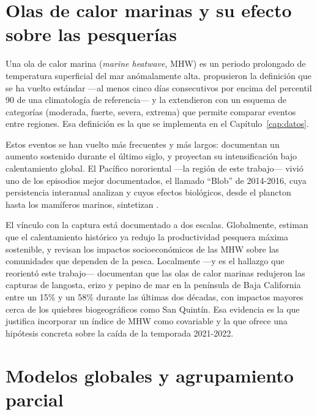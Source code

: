 \section{Olas de calor marinas y su efecto sobre las pesquerías}
\label{sec:revision_mhw}

Una ola de calor marina (\emph{marine heatwave}, MHW) es un periodo prolongado de temperatura
superficial del mar anómalamente alta. \citet{hobday2016} propusieron la definición que se ha
vuelto estándar ---al menos cinco días consecutivos por encima del percentil 90 de una
climatología de referencia--- y \citet{hobday2018} la extendieron con un esquema de categorías
(moderada, fuerte, severa, extrema) que permite comparar eventos entre regiones. Esa definición
es la que se implementa en el Capítulo~\ref{cap:datos}.

Estos eventos se han vuelto más frecuentes y más largos: \citet{oliver2018} documentan un
aumento sostenido durante el último siglo, y \citet{frolicher2018} proyectan su intensificación
bajo calentamiento global. El Pacífico nororiental ---la región de este trabajo--- vivió uno de
los episodios mejor documentados, el llamado ``Blob'' de 2014-2016, cuya persistencia
interanual analizan \citet{dilorenzo2016} y cuyos efectos biológicos, desde el plancton hasta
los mamíferos marinos, sintetizan \citet{cavole2016}.

El vínculo con la captura está documentado a dos escalas. Globalmente, \citet{free2019}
estiman que el calentamiento histórico ya redujo la productividad pesquera máxima sostenible, y
\citet{smith2021} revisan los impactos socioeconómicos de las MHW sobre las comunidades que
dependen de la pesca. Localmente ---y es el hallazgo que reorientó este trabajo---
\citet{villasenor2024} documentan que las olas de calor marinas redujeron las capturas de
langosta, erizo y pepino de mar en la península de Baja California entre un 15\% y un 58\%
durante las últimas dos décadas, con impactos mayores cerca de los quiebres biogeográficos como
San Quintín. Esa evidencia es la que justifica incorporar un índice de MHW como covariable y la
que ofrece una hipótesis concreta sobre la caída de la temporada 2021-2022.

\section{Modelos globales y agrupamiento parcial}
\label{sec:revision_globales}

